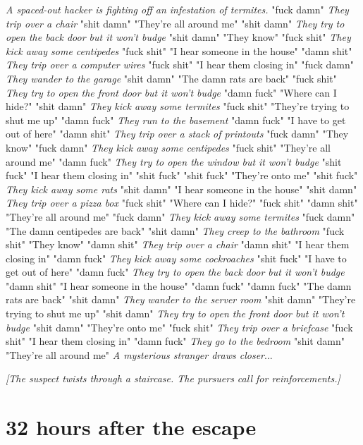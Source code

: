 \documentclass{report}
\begin{document}
\textit{A spaced-out hacker is fighting off an infestation of termites.} "fuck damn" \textit{They trip over a chair} "shit damn" "They're all around me" "shit damn" \textit{They try to open the back door but it won't budge} "shit damn" "They know" "fuck shit" \textit{They kick away some centipedes} "fuck shit" "I hear someone in the house" "damn shit" \textit{They trip over a computer wires} "fuck shit" "I hear them closing in" "fuck damn" \textit{They wander to the garage} "shit damn" "The damn rats are back" "fuck shit" \textit{They try to open the front door but it won't budge} "damn fuck" "Where can I hide?" "shit damn" \textit{They kick away some termites} "fuck shit" "They're trying to shut me up" "damn fuck" \textit{They run to the basement} "damn fuck" "I have to get out of here" "damn shit" \textit{They trip over a stack of printouts} "fuck damn" "They know" "fuck damn" \textit{They kick away some centipedes} "fuck shit" "They're all around me" "damn fuck" \textit{They try to open the window but it won't budge} "shit fuck" "I hear them closing in" "shit fuck" \textit{} "shit fuck" "They're onto me" "shit fuck" \textit{They kick away some rats} "shit damn" "I hear someone in the house" "shit damn" \textit{They trip over a pizza box} "fuck shit" "Where can I hide?" "fuck shit" \textit{} "damn shit" "They're all around me" "fuck damn" \textit{They kick away some termites} "fuck damn" "The damn centipedes are back" "shit damn" \textit{They creep to the bathroom} "fuck shit" "They know" "damn shit" \textit{They trip over a chair} "damn shit" "I hear them closing in" "damn fuck" \textit{They kick away some cockroaches} "shit fuck" "I have to get out of here" "damn fuck" \textit{They try to open the back door but it won't budge} "damn shit" "I hear someone in the house" "damn fuck" \textit{} "damn fuck" "The damn rats are back" "shit damn" \textit{They wander to the server room} "shit damn" "They're trying to shut me up" "shit damn" \textit{They try to open the front door but it won't budge} "shit damn" "They're onto me" "fuck shit" \textit{They trip over a briefcase} "fuck shit" "I hear them closing in" "damn fuck" \textit{They go to the bedroom} "shit damn" "They're all around me" \textit{A mysterious stranger draws closer}...

\textit{[The suspect twists through a staircase. The pursuers call for reinforcements.]}


\section*{32 \small{hours after the escape}}
\end{document}
